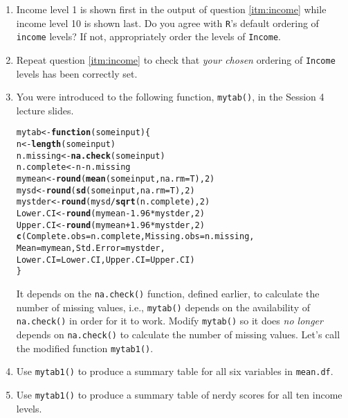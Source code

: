 \documentclass[12pt,a4paper]{article}\usepackage[]{graphicx}\usepackage[]{color}
\makeatletter
\newcommand{\hlnum}[1]{\textcolor[rgb]{0.686,0.059,0.569}{#1}}%
\newcommand{\hlopt}[1]{\textcolor[rgb]{0,0,0}{#1}}%
\newcommand{\hlstd}[1]{\textcolor[rgb]{0.345,0.345,0.345}{#1}}%
\newcommand{\hlkwa}[1]{\textcolor[rgb]{0.161,0.373,0.58}{\textbf{#1}}}%
\newcommand{\hlkwb}[1]{\textcolor[rgb]{0.69,0.353,0.396}{#1}}%
\newcommand{\hlkwc}[1]{\textcolor[rgb]{0.333,0.667,0.333}{#1}}%
\newcommand{\hlkwd}[1]{\textcolor[rgb]{0.737,0.353,0.396}{\textbf{#1}}}%
\newenvironment{kframe}{%
 \def\at@end@of@kframe{}%
 \ifinner\ifhmode%
  \def\at@end@of@kframe{\end{minipage}}%
  \begin{minipage}{\columnwidth}%
 \fi\fi%
 \def\FrameCommand##1{\hskip\@totalleftmargin \hskip-\fboxsep
 \colorbox{shadecolor}{##1}\hskip-\fboxsep
     \hskip-\linewidth \hskip-\@totalleftmargin \hskip\columnwidth}%
 \MakeFramed {\advance\hsize-\width
   \@totalleftmargin\z@ \linewidth\hsize
   \@setminipage}}%
 {\par\unskip\endMakeFramed%
 \at@end@of@kframe}
\newenvironment{knitrout}{}{} %
\makeatother
\begin{document}
\begin{enumerate}
\item \label{itm:level} Income level 1 is shown first in the output of question \ref{itm:income} while income level 10 is shown last. Do you agree with \texttt{R}'s default ordering of \texttt{income} levels? If not, appropriately order the levels of \texttt{Income}.
 
\item Repeat question \ref{itm:income} to check that {\em your chosen} ordering of \texttt{Income} levels has been correctly set.
 
\item You were introduced to the following function, \texttt{mytab()}, in the Session 4 lecture slides.
\begin{knitrout}
\color{fgcolor}\begin{kframe}
\begin{alltt}
\hlstd{mytab} \hlkwb{<-} \hlkwa{function}\hlstd{(}\hlkwc{someinput}\hlstd{)\{}
 \hlstd{n} \hlkwb{<-} \hlkwd{length}\hlstd{(someinput)}
 \hlstd{n.missing} \hlkwb{<-} \hlkwd{na.check}\hlstd{(someinput)}
 \hlstd{n.complete} \hlkwb{<-} \hlstd{n} \hlopt{-} \hlstd{n.missing}
 \hlstd{mymean} \hlkwb{<-} \hlkwd{round}\hlstd{(}\hlkwd{mean}\hlstd{(someinput,} \hlkwc{na.rm} \hlstd{= T),} \hlnum{2}\hlstd{)}
 \hlstd{mysd} \hlkwb{<-} \hlkwd{round}\hlstd{(}\hlkwd{sd}\hlstd{(someinput,} \hlkwc{na.rm} \hlstd{= T),} \hlnum{2}\hlstd{)}
 \hlstd{mystder} \hlkwb{<-} \hlkwd{round}\hlstd{(mysd}\hlopt{/}\hlkwd{sqrt}\hlstd{(n.complete),} \hlnum{2}\hlstd{)}
 \hlstd{Lower.CI} \hlkwb{<-} \hlkwd{round}\hlstd{(mymean} \hlopt{-} \hlnum{1.96}\hlopt{*}\hlstd{mystder,} \hlnum{2}\hlstd{)}
 \hlstd{Upper.CI} \hlkwb{<-} \hlkwd{round}\hlstd{(mymean} \hlopt{+} \hlnum{1.96}\hlopt{*}\hlstd{mystder,} \hlnum{2}\hlstd{)}
 \hlkwd{c}\hlstd{(}\hlkwc{Complete.obs} \hlstd{= n.complete,} \hlkwc{Missing.obs} \hlstd{= n.missing,}
   \hlkwc{Mean} \hlstd{= mymean,} \hlkwc{Std.Error} \hlstd{= mystder,}
   \hlkwc{Lower.CI} \hlstd{= Lower.CI,} \hlkwc{Upper.CI} \hlstd{= Upper.CI)}
\hlstd{\}}
\end{alltt}
\end{kframe}
\end{knitrout}
It depends on the \texttt{na.check()} function, defined earlier, to calculate the number of missing values, i.e., \texttt{mytab()} depends on the availability of \texttt{na.check()} in order for it to work. Modify \texttt{mytab()} so it does {\em no longer} depends on \texttt{na.check()} to calculate the number of missing values. Let's call the modified function \texttt{mytab1()}.
 
\item Use \texttt{mytab1()} to produce a summary table for all six variables in \texttt{mean.df}.
 
\item Use \texttt{mytab1()} to produce a summary table of nerdy scores for all ten income levels.
 
\end{enumerate}
 
\end{document}
